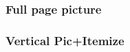 \documentclass[xcolor=dvipsnames,aspectratio=169]{beamer} %
\begin{document}
{{\begin{frame}[t]
\vspace{-20pt}

\frametitle{Full page picture}

\end{frame}

\begin{frame}[t]

\frametitle{Vertical Pic+Itemize}

\begin{minipage}{0.35\textwidth}

\vspace{-24pt}


\end{minipage}
\end{frame}}}
\end{document}
